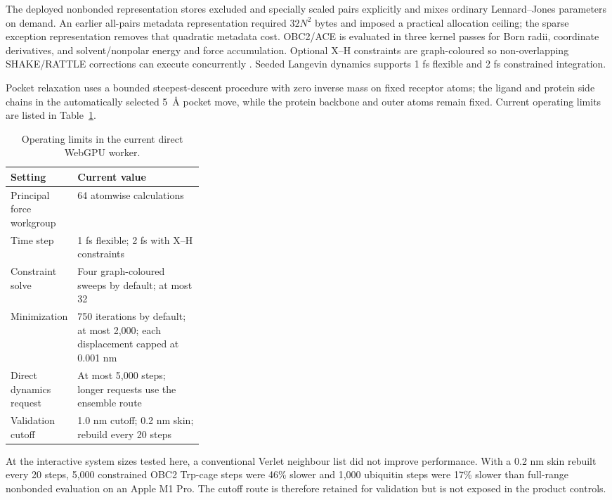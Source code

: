 \documentclass[11pt]{article}
\begin{document}
\begin{small}
The deployed nonbonded representation stores excluded and specially scaled pairs explicitly and mixes ordinary Lennard--Jones parameters on demand. An earlier all-pairs metadata representation required $32N^2$ bytes and imposed a practical allocation ceiling; the sparse exception representation removes that quadratic metadata cost. OBC2/ACE is evaluated in three kernel passes for Born radii, coordinate derivatives, and solvent/nonpolar energy and force accumulation. Optional X--H constraints are graph-coloured so non-overlapping SHAKE/RATTLE corrections can execute concurrently \citep{ryckaert1977shake,andersen1983rattle}. Seeded Langevin dynamics supports 1 fs flexible and 2 fs constrained integration.

Pocket relaxation uses a bounded steepest-descent procedure with zero inverse mass on fixed receptor atoms; the ligand and protein side chains in the automatically selected 5~\AA{} pocket move, while the protein backbone and outer atoms remain fixed. Current operating limits are listed in Table~\ref{tab:appA_webgpu_limits}.

\begin{table}[htbp]
\centering\small
\caption{Operating limits in the current direct WebGPU worker.}
\label{tab:appA_webgpu_limits}
\begin{tabularx}{0.95\linewidth}{@{}p{0.32\linewidth}X@{}}
\toprule
\textbf{Setting} & \textbf{Current value}\\
\midrule
Principal force workgroup & 64 atomwise calculations\\
Time step & 1 fs flexible; 2 fs with X--H constraints\\
Constraint solve & Four graph-coloured sweeps by default; at most 32\\
Minimization & 750 iterations by default; at most 2,000; each displacement capped at 0.001 nm\\
Direct dynamics request & At most 5,000 steps; longer requests use the ensemble route\\
Validation cutoff & 1.0 nm cutoff; 0.2 nm skin; rebuild every 20 steps\\
\bottomrule
\end{tabularx}
\end{table}

At the interactive system sizes tested here, a conventional Verlet neighbour list did not improve performance. With a 0.2 nm skin rebuilt every 20 steps, 5,000 constrained OBC2 Trp-cage steps were 46\% slower and 1,000 ubiquitin steps were 17\% slower than full-range nonbonded evaluation on an Apple M1 Pro. The cutoff route is therefore retained for validation but is not exposed in the product controls.


\end{small}
\end{document}
